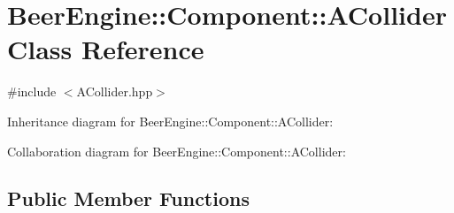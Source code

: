 \hypertarget{class_beer_engine_1_1_component_1_1_a_collider}{}\section{Beer\+Engine\+:\+:Component\+:\+:A\+Collider Class Reference}
\label{class_beer_engine_1_1_component_1_1_a_collider}


{\ttfamily \#include $<$A\+Collider.\+hpp$>$}



Inheritance diagram for Beer\+Engine\+:\+:Component\+:\+:A\+Collider\+:


Collaboration diagram for Beer\+Engine\+:\+:Component\+:\+:A\+Collider\+:
\subsection*{Public Member Functions}
